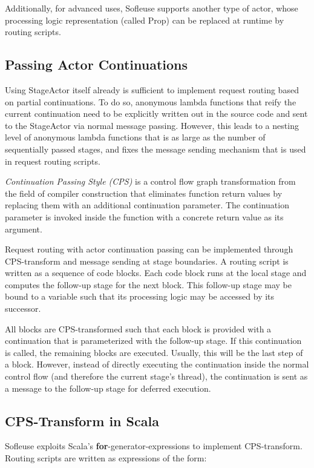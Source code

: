 \documentclass{sig-alternate}
\begin{document}
Additionally, for advanced uses, Sofleuse supports another type of actor, whose processing logic
representation (called Prop) can be replaced at runtime by routing scripts.


\subsection{Passing Actor Continuations}

Using StageActor itself already is sufficient to implement request routing based on partial
continuations. To do so, anonymous lambda functions that reify the current continuation need to be
explicitly written out in the source code and sent to the StageActor via normal message passing.
However, this leads to a nesting level of anonymous lambda functions that is as large as the number
of sequentially passed stages, and fixes the message sending mechanism that is used in request
routing scripts.

\emph{Continuation Passing Style (CPS)} is a control flow graph transformation from the field of
compiler construction that eliminates function return values by replacing them with an additional
continuation parameter. The continuation parameter is invoked inside the function with a
concrete return value as its argument.

Request routing with actor continuation passing can be implemented through CPS-transform and
message sending at stage boundaries.  A routing script is written as a sequence of code blocks.
Each code block runs at the local stage and computes the follow-up stage for the next block.
This follow-up stage may be bound to a variable such that its processing logic may be accessed
by its successor.

All blocks are CPS-transformed such that each block is provided with a continuation that is
parameterized with the follow-up stage. If this continuation is called, the remaining blocks are
executed. Usually, this will be the last step of a block. However, instead of directly executing the
continuation inside the normal control flow (and therefore the current stage's thread), the 
continuation is sent as a message to the follow-up stage for deferred execution.


\subsection{CPS-Transform in Scala}     

Sofleuse exploits Scala's \textbf{for}-generator-expressions to implement CPS-transform. Routing
scripts are written as expressions of the form:
\end{document}

